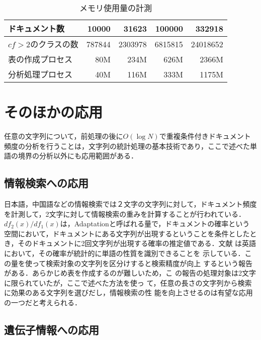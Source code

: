 \begin{table}[htbp]
\begin{center}
\begin{tabular}{|l||r|r|r|r|}
\hline
ドキュメント数     &      10000&   31623&   100000&   332918\\
\hline
$cf>2$のクラスの数 &     787844& 2303978&  6815815& 24018652\\
表の作成プロセス   &        80M&    234M&     626M&    2366M\\
分析処理プロセス   &        40M&    116M&     333M&    1175M\\
\hline
\end{tabular}
\vspace*{2mm}
\caption{メモリ使用量の計測}
\label{プロセス}
\end{center}
\end{table}

\newpage

\section{そのほかの応用}

任意の文字列について，前処理の後に$O(\log N)$で重複条件付きドキュメント
頻度の分析を行うことは，文字列の統計処理の基本技術であり，ここで述べた単
語の境界の分析以外にも応用範囲がある．

\subsection{情報検索への応用}

日本語，中国語などの情報検索では２文字の文字列に対して，ドキュメント頻度
を計測して，2文字に対して情報検索の重みを計算することが行われている．
$df_2(x)/df_1(x)$は，Adaptationと呼ばれる量で，ドキュメントの確率という
空間において，ドキュメントにある文字列が出現するということを条件としたと
き，そのドキュメントに2回文字列が出現する確率の推定値である．文献
\cite{DF2}は英語において，その確率が統計的に単語の性質を識別できることを
示している．この量を使って検索対象の文字列を区分けすると検索精度が向上
するという報告\cite{IR}がある．あらかじめ表を作成するのが難しいため，こ
の報告の処理対象は2文字に限られていたが，ここで述べた方法を使っ
て，任意の長さの文字列から検索に効果のある文字列を選びだし，情報検索の性
能を向上させるのは有望な応用の一つだと考えられる．

\subsection{遺伝子情報への応用}

